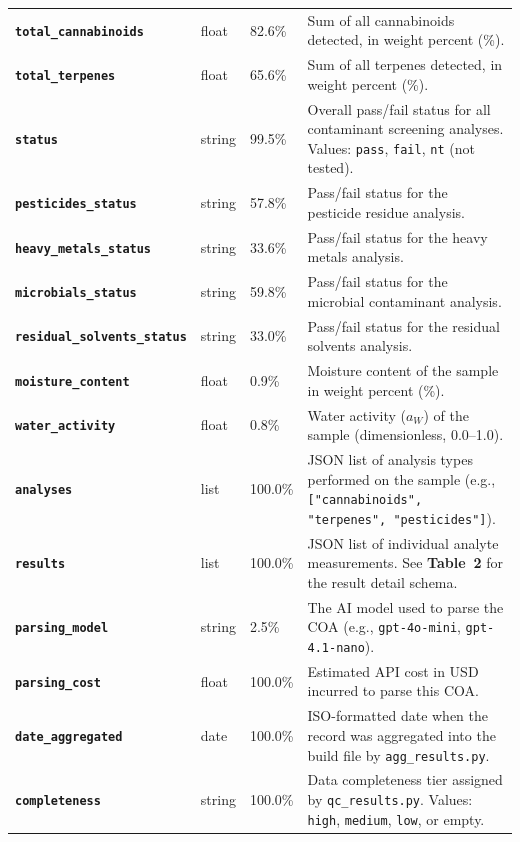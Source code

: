 \documentclass[11pt,letterpaper]{article}
\newcommand{\fieldname}[1]{\texttt{\textbf{#1}}}
\begin{document}
\begin{longtable}{@{}L{4.2cm}C{1.1cm}C{1.6cm}p{9.5cm}@{}}
\fieldname{total\_cannabinoids} & float & 82.6\% & Sum of all cannabinoids detected, in weight percent (\%). \\[0.4em]
\fieldname{total\_terpenes} & float & 65.6\% & Sum of all terpenes detected, in weight percent (\%). \\[0.4em]
\fieldname{status} & string & 99.5\% & Overall pass/fail status for all contaminant screening analyses. Values: \texttt{pass}, \texttt{fail}, \texttt{nt} (not tested). \\[0.4em]
\fieldname{pesticides\_status} & string & 57.8\% & Pass/fail status for the pesticide residue analysis. \\[0.4em]
\fieldname{heavy\_metals\_status} & string & 33.6\% & Pass/fail status for the heavy metals analysis. \\[0.4em]
\fieldname{microbials\_status} & string & 59.8\% & Pass/fail status for the microbial contaminant analysis. \\[0.4em]
\fieldname{residual\_solvents\_status} & string & 33.0\% & Pass/fail status for the residual solvents analysis. \\[0.4em]
\fieldname{moisture\_content} & float & 0.9\% & Moisture content of the sample in weight percent (\%). \\[0.4em]
\fieldname{water\_activity} & float & 0.8\% & Water activity ($a_W$) of the sample (dimensionless, 0.0--1.0). \\[0.4em]
\fieldname{analyses} & list & 100.0\% & JSON list of analysis types performed on the sample (e.g., \texttt{["cannabinoids", "terpenes", "pesticides"]}). \\[0.4em]
\fieldname{results} & list & 100.0\% & JSON list of individual analyte measurements. See \textbf{Table~2} for the result detail schema. \\[0.4em]
\fieldname{parsing\_model} & string & 2.5\% & The AI model used to parse the COA (e.g., \texttt{gpt-4o-mini}, \texttt{gpt-4.1-nano}). \\[0.4em]
\fieldname{parsing\_cost} & float & 100.0\% & Estimated API cost in USD incurred to parse this COA. \\[0.4em]
\fieldname{date\_aggregated} & date & 100.0\% & ISO-formatted date when the record was aggregated into the build file by \texttt{agg\_results.py}. \\[0.4em]
\fieldname{completeness} & string & 100.0\% & Data completeness tier assigned by \texttt{qc\_results.py}. Values: \texttt{high}, \texttt{medium}, \texttt{low}, or empty. \\
\end{longtable}
\end{document}
